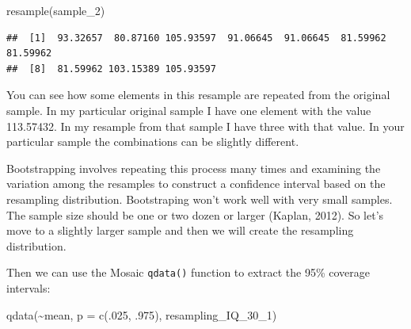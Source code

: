 \documentclass[
]{book}
\newenvironment{Shaded}{\begin{snugshade}}{\end{snugshade}}
\newcommand{\AttributeTok}[1]{\textcolor[rgb]{0.77,0.63,0.00}{#1}}
\newcommand{\DecValTok}[1]{\textcolor[rgb]{0.00,0.00,0.81}{#1}}
\newcommand{\FunctionTok}[1]{\textcolor[rgb]{0.00,0.00,0.00}{#1}}
\newcommand{\NormalTok}[1]{#1}
\newcommand{\OtherTok}[1]{\textcolor[rgb]{0.56,0.35,0.01}{#1}}
\newcommand{\SpecialCharTok}[1]{\textcolor[rgb]{0.00,0.00,0.00}{#1}}
\begin{document}
\begin{Shaded}
\begin{Highlighting}[]
\FunctionTok{resample}\NormalTok{(sample\_2)}
\end{Highlighting}
\end{Shaded}

\begin{verbatim}
##  [1]  93.32657  80.87160 105.93597  91.06645  91.06645  81.59962  81.59962
##  [8]  81.59962 103.15389 105.93597
\end{verbatim}

You can see how some elements in this resample are repeated from the original sample. In my particular original sample I have one element with the value 113.57432. In my resample from that sample I have three with that value. In your particular sample the combinations can be slightly different.

Bootstrapping involves repeating this process many times and examining the variation among the resamples to construct a confidence interval based on the resampling distribution. Bootstraping won't work well with very small samples. The sample size should be one or two dozen or larger (Kaplan, 2012). So let's move to a slightly larger sample and then we will create the resampling distribution.

\begin{Shaded}
\end{Shaded}

Then we can use the Mosaic \texttt{qdata()} function to extract the 95\% coverage intervals:

\begin{Shaded}
\begin{Highlighting}[]
\FunctionTok{qdata}\NormalTok{(}\SpecialCharTok{\textasciitilde{}}\NormalTok{mean, }\AttributeTok{p =} \FunctionTok{c}\NormalTok{(.}\DecValTok{025}\NormalTok{, .}\DecValTok{975}\NormalTok{), resampling\_IQ\_30\_1)}
\end{Highlighting}
\end{Shaded}
\end{document}

